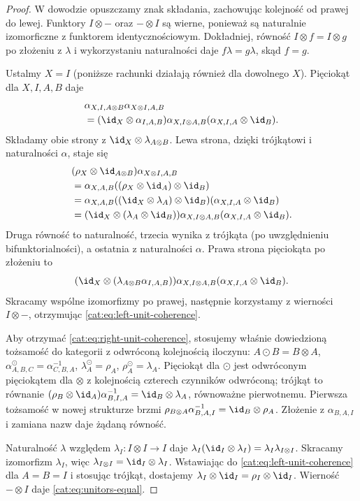 \begin{proof}
W dowodzie opuszczamy znak składania, zachowując kolejność od prawej do lewej. Funktory $I\otimes-$ oraz $-\otimes I$ są wierne, ponieważ są naturalnie izomorficzne z funktorem identycznościowym. Dokładniej, równość $I\otimes f=I\otimes g$ po złożeniu z $\lambda$ i wykorzystaniu naturalności daje $f\lambda=g\lambda$, skąd $f=g$.

Ustalmy $X=I$ (poniższe rachunki działają również dla dowolnego $X$). Pięciokąt dla $X,I,A,B$ daje
\[
\begin{aligned}
&\alpha_{X,I,A\otimes B}\alpha_{X\otimes I,A,B}\\
&=(\id_X\otimes\alpha_{I,A,B})
\alpha_{X,I\otimes A,B}(\alpha_{X,I,A}\otimes\id_B).
\end{aligned}
\]
Składamy obie strony z $\id_X\otimes\lambda_{A\otimes B}$. Lewa strona, dzięki trójkątowi i naturalności $\alpha$, staje się
\[
\begin{aligned}
&(\rho_X\otimes\id_{A\otimes B})\alpha_{X\otimes I,A,B}\\
&=\alpha_{X,A,B}((\rho_X\otimes\id_A)\otimes\id_B)\\
&=\alpha_{X,A,B}((\id_X\otimes\lambda_A)\otimes\id_B)
(\alpha_{X,I,A}\otimes\id_B)\\
&=(\id_X\otimes(\lambda_A\otimes\id_B))
\alpha_{X,I\otimes A,B}(\alpha_{X,I,A}\otimes\id_B).
\end{aligned}
\]
Druga równość to naturalność, trzecia wynika z trójkąta (po uwzględnieniu bifunktorialności), a ostatnia z naturalności $\alpha$. Prawa strona pięciokąta po złożeniu to
\[
(\id_X\otimes(\lambda_{A\otimes B}\alpha_{I,A,B}))
\alpha_{X,I\otimes A,B}(\alpha_{X,I,A}\otimes\id_B).
\]
Skracamy wspólne izomorfizmy po prawej, następnie korzystamy z wierności $I\otimes-$, otrzymując \eqref{cat:eq:left-unit-coherence}.

Aby otrzymać \eqref{cat:eq:right-unit-coherence}, stosujemy właśnie dowiedzioną tożsamość do kategorii z odwróconą kolejnością iloczynu: $A\odot B=B\otimes A$, $\alpha^\odot_{A,B,C}=\alpha^{-1}_{C,B,A}$, $\lambda^\odot_A=\rho_A$, $\rho^\odot_A=\lambda_A$. Pięciokąt dla $\odot$ jest odwróconym pięciokątem dla $\otimes$ z kolejnością czterech czynników odwróconą; trójkąt to równanie $(\rho_B\otimes\id_A)\alpha_{B,I,A}^{-1}=\id_B\otimes\lambda_A$, równoważne pierwotnemu. Pierwsza tożsamość w nowej strukturze brzmi $\rho_{B\otimes A}\alpha_{B,A,I}^{-1}=\id_B\otimes\rho_A$. Złożenie z $\alpha_{B,A,I}$ i zamiana nazw daje żądaną równość.

Naturalność $\lambda$ względem $\lambda_I:I\otimes I\to I$ daje $\lambda_I(\id_I\otimes\lambda_I)=\lambda_I\lambda_{I\otimes I}$. Skracamy izomorfizm $\lambda_I$, więc $\lambda_{I\otimes I}=\id_I\otimes\lambda_I$. Wstawiając do \eqref{cat:eq:left-unit-coherence} dla $A=B=I$ i stosując trójkąt, dostajemy $\lambda_I\otimes\id_I=\rho_I\otimes\id_I$. Wierność $-\otimes I$ daje \eqref{cat:eq:unitors-equal}.
\end{proof}

